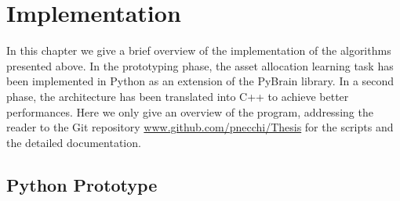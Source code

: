 \chapter{Implementation}

In this chapter we give a brief overview of the implementation of the algorithms presented above. In the prototyping phase, the asset allocation learning task has been implemented in Python as an extension of the PyBrain library. In a second phase, the architecture has been translated into C++ to achieve better performances. Here we only give an overview of the program, addressing the reader to the Git repository \url{www.github.com/pnecchi/Thesis} for the scripts and the detailed documentation. 

\section{Python Prototype}
\label{sec:python_prototype}

